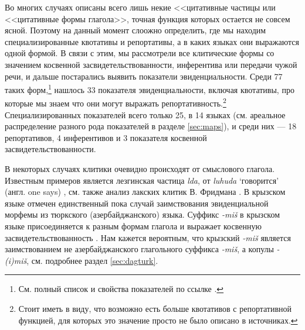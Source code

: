 Во многих случаях описаны всего лишь некие <<цитативные частицы или <<цитативные формы глагола>>, точная функция которых остается не совсем ясной. Поэтому на данный момент слоожно определить, где мы находим специализированные квотативы и репортативы, а в каких языках они выражаются одной формой. В связи с этим, мы рассмотрели все клитические формы со значением косвенной засвидетельствованности, инферентива или передачи чужой речи, и дальше постарались выявить показатели эвиденциальности. Среди 77 таких форм,\footnote{См. полный список и свойства показателей по ссылке \url{}.} нашлось 33 показателя эвиденциальности, включая квотативы, про которые мы знаем что они могут выражать репортативность.\footnote{Стоит иметь в виду, что возможно есть больше квотативов с репортативной функцией, для которых это значение просто не было описано в источниках.} Специализированных показателей всего только 25, в 14 языках (см. ареальное распределение разного рода показателей в разделе \ref{sec:maps}), и среди них --- 18 репортативов, 4 инферентивов и 3 показателя косвенной засвидетельствованности. 
\par В некоторых случаях клитики очевидно происходят от смыслового глагола. Известным примеров является лезгинская частица \textit{lda}, от \textit{luhuda} `говорится' (англ. one says) \citep{haspelmath1993}, см. также анализ лакских клитик В. Фридмана \citep[367--368]{friedman2007}. В крызском языке отмечен единственный пока случай заимствования эвиденциальной морфемы из тюркского (азербайджанского) языка. Суффикс \textit{-miš} в крызском языке присоединяется к разным формам глагола и выражает косвенную засвидетельствованность \citep[255--257]{authier2009}. Нам кажется вероятным, что крызский \textit{-miš} является заимствованием не азербайджанского глагольного суффикса \textit{-miš}, а копулы \textit{-(i)miš}, см. подробнее раздел \ref{sec:dagturk}.

